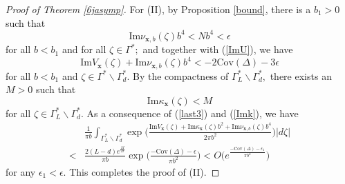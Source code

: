 \documentclass[11pt]{article}
\renewcommand{\setminus}{{\smallsetminus}}
\theoremstyle{remark}
\theoremstyle{remark}
\numberwithin{equation}{section}
\begin{document}
\begin{proof}[Proof of Theorem \ref{6jasymp}]
For  (II), by Proposition \ref{bound}, there is a  $b_1>0$ such that 
\begin{equation}\label{last2}
\mathrm{Im}\nu_{\boldsymbol x,b}(\zeta)b^4<Nb^4<\epsilon 
\end{equation}
for all $b<b_1$ and for all $\zeta\in\Gamma^*;$  and together with  (\ref{ImU}), we have
\begin{equation}\label{last3}
\mathrm{Im}V_{\boldsymbol  x}(\zeta)+\mathrm{Im}  \nu_{\boldsymbol  x,b}(\zeta)b^4< -2\mathrm{Cov}(\Delta) -3\epsilon
\end{equation}
for all $b<b_1$ and  $\zeta\in\Gamma^*\setminus \Gamma^*_d.$ By the compactness of ${\Gamma^*_L}\setminus \Gamma^*_d,$ there exists an $M>0$ such that 
\begin{equation}\label{Imk}
\mathrm{Im}\kappa_{\boldsymbol x}(\zeta)<M
\end{equation}
for all $\zeta\in\Gamma^*_L\setminus \Gamma^*_d.$ As a consequence of (\ref{last3}) and (\ref{Imk}), we have
\begin{equation*}
\begin{split}
&\frac{1}{\pi b}\int_{\Gamma^*_L\setminus \Gamma^*_d}\exp\bigg(\frac{\mathrm{Im}V_{\boldsymbol  x}(\zeta)+\mathrm{Im}\kappa_{\boldsymbol  x}(\zeta)b^2+\mathrm{Im}\nu_{\boldsymbol  x,b}(\zeta)b^4}{2\pi b^2} \bigg)|d\zeta|\\
<  & \frac{2(L-d) e^{\frac{M}{2\pi}}}{\pi b} \exp\bigg(\frac{-\mathrm{Cov}(\Delta)-\epsilon }{\pi b^2}   \bigg )< O\Big(e^{\frac{-\mathrm{Cov}(\Delta)-\epsilon_1}{\pi b^2}}\Big)
\end{split}
\end{equation*}
for any $\epsilon_1<\epsilon.$ This completes the proof of (II). 
\smallskip





\end{proof}
\end{document}
